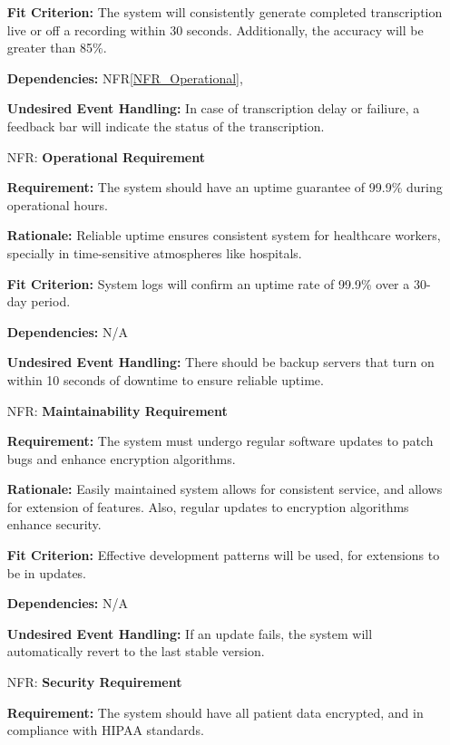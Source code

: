 \documentclass[12pt]{article}
\newcounter{nfrnum} %
\begin{document}
\begin{itemize}
    \textbf{Fit Criterion:} The system will consistently generate completed transcription live or off a recording within 30 seconds. Additionally, the accuracy will be greater than 85\%.

    \textbf{Dependencies:} NFR\ref{NFR_Operational}, \label{FR_DictationRecording}

    \textbf{Undesired Event Handling:} In case of transcription delay or failiure, a feedback bar will indicate the status of the transcription.

\item[NFR\refstepcounter{nfrnum}\thenfrnum \label{NFR_Operational}:] \textbf{Operational Requirement}

    \textbf{Requirement:} The system should have an uptime guarantee of 99.9\% during operational hours.

    \textbf{Rationale:} Reliable uptime ensures consistent system for healthcare workers, specially in time-sensitive atmospheres like hospitals.

    \textbf{Fit Criterion:} System logs will confirm an uptime rate of 99.9\% over a 30-day period.  

    \textbf{Dependencies:} N/A
    
    \textbf{Undesired Event Handling:} There should be backup servers that turn on within 10 seconds of downtime to ensure reliable uptime.

\item[NFR\refstepcounter{nfrnum}\thenfrnum \label{NFR_Maintainability}:] \textbf{Maintainability Requirement}

    \textbf{Requirement:} The system must undergo regular software updates to patch bugs and enhance encryption algorithms.

    \textbf{Rationale:} Easily maintained system allows for consistent service, and allows for extension of features. Also, regular updates to encryption algorithms enhance security.

    \textbf{Fit Criterion:} Effective development patterns will be used, for extensions to be in updates.

    \textbf{Dependencies:} N/A

    \textbf{Undesired Event Handling:} If an update fails, the system will automatically revert to the last stable version.

\item[NFR\refstepcounter{nfrnum}\thenfrnum \label{NFR_Security}:] \textbf{Security Requirement}

    \textbf{Requirement:} The system should have all patient data encrypted, and in compliance with HIPAA standards.


\end{itemize}
\end{document}
